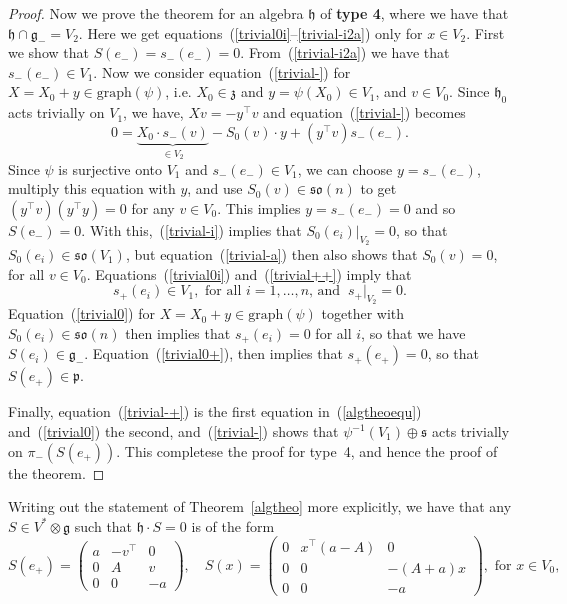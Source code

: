 \documentclass[11pt,a4paper]{amsart}
\newcommand{\p}{\mathfrak{p}}
\newcommand{\g}{\mathfrak{g}}
\newcommand{\h}{\mathfrak{h}}
\newcommand{\z}{\mathfrak{z}}
\newcommand{\s}{\mathfrak{s}}
\newcommand{\+}{\oplus}
\newcommand{\so}{\mathfrak{so}}
\newcommand{\1}{\mathbf{1}}
\newcommand{\e}{\mathrm{e}}
\newcommand{\<}{\langle}
\renewcommand{\>}{\rangle}
\theoremstyle{definition}
\theoremstyle{plain}
\numberwithin{equation}{section}
\begin{document}
\begin{proof}
 
Now we prove the theorem for an algebra $\h$ of {\bf type 4}, where we have that $\h\cap \g_-=V_2$.
Here we get equations~(\ref{trivial0i}--\ref{trivial-i2a}) only for $x\in V_2$. First we show that $S(e_-)=s_-(e_-)=0$. 
From~(\ref{trivial-i2a}) we have that $s_-(e_-)\in V_1$. 
Now we consider equation~(\ref{trivial-}) for  $X=X_0+y\in \mathrm{graph}(\psi)$, i.e. $X_0\in \z$ and $y=\psi(X_0)\in V_1$, and $v\in V_0$. Since $\h_0$ acts trivially on $V_1$, we have, $Xv=-y^\top v$ and equation~(\ref{trivial-}) becomes
\begin{equation}\label{trivial-a}
0=\underbrace{X_0\cdot s_-(v)}_{\in V_2} -S_0(v)\cdot y + (y^\top v) s_-(e_-).
\end{equation}
Since $\psi$ is surjective onto $V_1$ and $s_-(e_-)\in V_1$, we can choose $y=s_-(e_-)$, multiply this equation with $y$, and use $S_0(v)\in \so(n)$ to get
$(y^\top v)(y^\top y)=0$ for any $v\in V_0$. This implies $y=s_-(e_-)=0$ and so
$S(\e_-)=0$.
With this,~(\ref{trivial-i}) implies that $S_0(e_i)|_{V_2}=0$, so that $S_0(e_i)\in \so(V_1)$, but equation~(\ref{trivial-a}) then also shows that $S_0(v)=0$, for all $v\in V_0$.
Equations~(\ref{trivial0i}) and~(\ref{trivial++})  imply that
\[s_+(e_i)\in V_1,\text{ for all $i=1, \ldots, n$, and }\ s_+|_{V_2}=0.  \]
Equation~(\ref{trivial0}) for  $X=X_0+y\in \mathrm{graph}(\psi)$ together with $S_0(e_i)\in \so(n)$ then implies that $s_+(e_i)=0$ for all $i$, so that we have
$S(e_i)\in \g_-$. 
Equation~(\ref{trivial0+}), then implies that $s_+(e_+)=0$, so that
$S(e_+)\in \p$.

Finally, equation~(\ref{trivial-+}) is the first equation in~(\ref{algtheoequ}) and~(\ref{trivial0}) the second, and~(\ref{trivial-}) shows that $\psi^{-1}(V_1)\+\s$ acts trivially on $\pi_-(S(e_+))$. This completese the proof for type~4, and hence the proof of the theorem.
\end{proof}
Writing out the statement of Theorem~\ref{algtheo} more explicitly, we have that any $S\in V^*\otimes \g$ such that $\h\cdot S =0 $ is of the form
\begin{equation}\label{Sexplicit}
S(e_+)=\begin{pmatrix}
a &  -v^\top & 0 \\
0 &A & v
\\0&0&-a
\end{pmatrix},
\quad
S(x)
=\begin{pmatrix}
0 &  x^\top(a-A) & 0 \\
0 &0 & -(A+a)x
\\0&0&-a
\end{pmatrix},
\text{ for  }x\in V_0,\end{equation}
\end{document}
